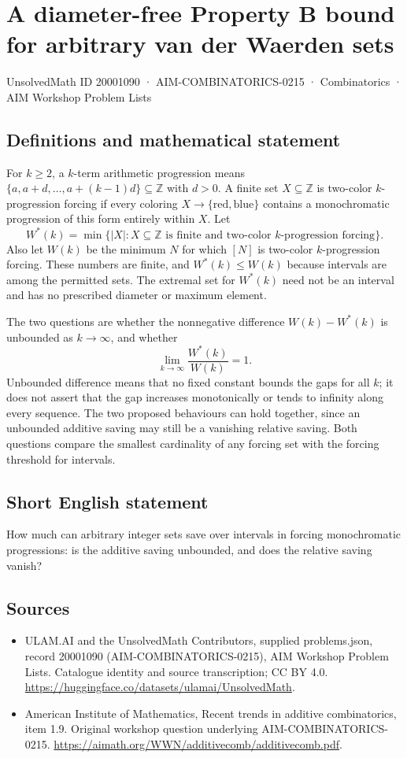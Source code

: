 \documentclass[11pt,a4paper]{article}
\begin{document}
\section*{A diameter-free Property B bound for arbitrary van der Waerden sets}\label{20001090}
{\small UnsolvedMath ID 20001090 · AIM-COMBINATORICS-0215 · Combinatorics · AIM Workshop Problem Lists}
\subsection{Definitions and mathematical statement}
For $k\ge2$, a $k$-term arithmetic progression means
$\{a,a+d,\ldots,a+(k-1)d\}\subseteq\mathbb Z$ with $d>0$.
A finite set $X\subseteq\mathbb Z$ is two-color $k$-progression
forcing if every coloring $X\to\{\mathrm{red},\mathrm{blue}\}$
contains a monochromatic progression of this form entirely within $X$.
Let
\[
 W^*(k)=\min\{|X|:X\subseteq\mathbb Z\text{ is finite and
                                      two-color }k\text{-progression forcing}\}.
\]
Also let $W(k)$ be the minimum $N$ for which $[N]$ is two-color
$k$-progression forcing. These numbers are finite, and
$W^*(k)\le W(k)$ because intervals are among the permitted sets.
The extremal set for $W^*(k)$ need not be an interval and has no
prescribed diameter or maximum element.

The two questions are whether the nonnegative difference
$W(k)-W^*(k)$ is unbounded as $k\to\infty$, and whether
\[
                         \lim_{k\to\infty}\frac{W^*(k)}{W(k)}=1.
\]
Unbounded difference means that no fixed constant bounds the gaps
for all $k$; it does not assert that the gap increases monotonically
or tends to infinity along every sequence. The two proposed behaviours
can hold together, since an unbounded additive saving may still be
a vanishing relative saving. Both questions compare the smallest
cardinality of any forcing set with the forcing threshold for intervals.
\subsection{Short English statement}
How much can arbitrary integer sets save over intervals in forcing monochromatic progressions: is the additive saving unbounded, and does the relative saving vanish?
\subsection{Sources}
\begin{itemize}
\item[S1] ULAM.AI and the UnsolvedMath Contributors, supplied problems.json, record 20001090 (AIM-COMBINATORICS-0215), AIM Workshop Problem Lists. Catalogue identity and source transcription; CC BY 4.0.
\url{https://huggingface.co/datasets/ulamai/UnsolvedMath}.
\item[S2] American Institute of Mathematics, Recent trends in additive combinatorics, item 1.9. Original workshop question underlying AIM-COMBINATORICS-0215.
\url{https://aimath.org/WWN/additivecomb/additivecomb.pdf}.
\end{itemize}
\end{document}
